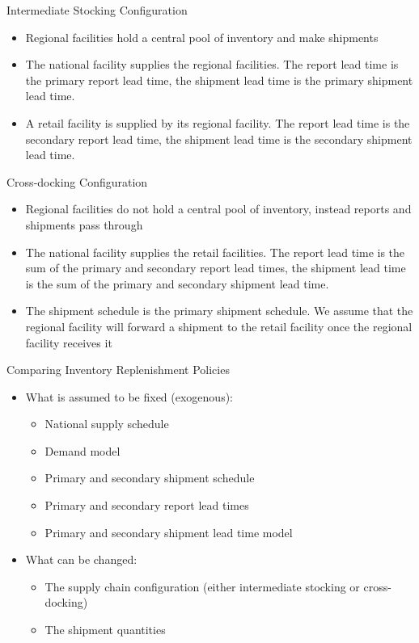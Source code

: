 \documentclass{beamer}
\begin{document}
\begin{frame}{Intermediate Stocking Configuration}
\begin{itemize}
\item Regional facilities hold a central pool of inventory and make shipments
\item The national facility supplies the regional facilities.
The report lead time is the primary report lead time,
the shipment lead time is the primary shipment lead time.
\item A retail facility is supplied by its regional facility.
The report lead time is the secondary report lead time,
the shipment lead time is the secondary shipment lead time.
\end{itemize}
\end{frame}

\begin{frame}{Cross-docking Configuration}
\begin{itemize}
\item Regional facilities do not hold a central pool of inventory,
instead reports and shipments pass through
\item The national facility supplies the retail facilities.
The report lead time is
the sum of the primary and secondary report lead times,
the shipment lead time is
the sum of the primary and secondary shipment lead time.
\item The shipment schedule is the primary shipment schedule.
We assume that the regional facility will forward a shipment
to the retail facility once the regional facility receives it
\end{itemize}
\end{frame}




\begin{frame}{Comparing Inventory Replenishment Policies}
\begin{itemize}
\item What is assumed to be fixed (exogenous):
  \begin{itemize}
  \item National supply schedule
  \item Demand model
  \item Primary and secondary shipment schedule
  \item Primary and secondary report lead times
  \item Primary and secondary shipment lead time model
  \end{itemize}
\item What can be changed:
  \begin{itemize}
  \item The supply chain configuration
    (either intermediate stocking or cross-docking)
  \item The shipment quantities
  \end{itemize}
\end{itemize}
\end{frame}
\end{document}
